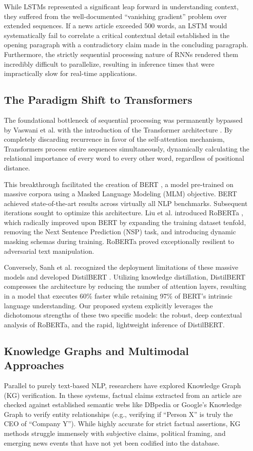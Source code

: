 \documentclass[conference]{IEEEtran}
\begin{document}
While LSTMs represented a significant leap forward in understanding context, they suffered from the well-documented ``vanishing gradient'' problem over extended sequences. If a news article exceeded 500 words, an LSTM would systematically fail to correlate a critical contextual detail established in the opening paragraph with a contradictory claim made in the concluding paragraph. Furthermore, the strictly sequential processing nature of RNNs rendered them incredibly difficult to parallelize, resulting in inference times that were impractically slow for real-time applications.

\subsection{The Paradigm Shift to Transformers}
The foundational bottleneck of sequential processing was permanently bypassed by Vaswani et al. with the introduction of the Transformer architecture \cite{b1}. By completely discarding recurrence in favor of the self-attention mechanism, Transformers process entire sequences simultaneously, dynamically calculating the relational importance of every word to every other word, regardless of positional distance.

This breakthrough facilitated the creation of BERT \cite{b2}, a model pre-trained on massive corpora using a Masked Language Modeling (MLM) objective. BERT achieved state-of-the-art results across virtually all NLP benchmarks. Subsequent iterations sought to optimize this architecture. Liu et al. introduced RoBERTa \cite{b3}, which radically improved upon BERT by expanding the training dataset tenfold, removing the Next Sentence Prediction (NSP) task, and introducing dynamic masking schemas during training. RoBERTa proved exceptionally resilient to adversarial text manipulation.

Conversely, Sanh et al. recognized the deployment limitations of these massive models and developed DistilBERT \cite{b6}. Utilizing knowledge distillation, DistilBERT compresses the architecture by reducing the number of attention layers, resulting in a model that executes 60\% faster while retaining 97\% of BERT's intrinsic language understanding. Our proposed system explicitly leverages the dichotomous strengths of these two specific models: the robust, deep contextual analysis of RoBERTa, and the rapid, lightweight inference of DistilBERT.

\subsection{Knowledge Graphs and Multimodal Approaches}
Parallel to purely text-based NLP, researchers have explored Knowledge Graph (KG) verification. In these systems, factual claims extracted from an article are checked against established semantic webs like DBpedia or Google's Knowledge Graph to verify entity relationships (e.g., verifying if ``Person X'' is truly the CEO of ``Company Y''). While highly accurate for strict factual assertions, KG methods struggle immensely with subjective claims, political framing, and emerging news events that have not yet been codified into the database.
\end{document}
